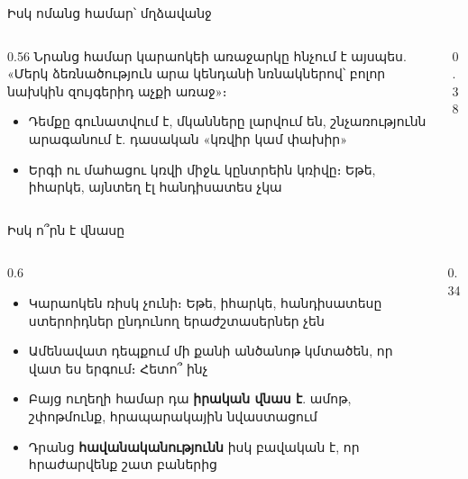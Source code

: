\begin{frame}{Իսկ ոմանց համար՝ մղձավանջ}
  \begin{columns}[c]
    \begin{column}{0.56\textwidth}
      Նրանց համար կարաոկեի առաջարկը հնչում է այսպես. «Մերկ ձեռնածություն արա կենդանի նռնակներով՝ բոլոր նախկին զույգերիդ աչքի առաջ»։\par\medskip
      \begin{itemize}
        \item<2-> Դեմքը գունատվում է, մկանները լարվում են, շնչառությունն արագանում է. դասական «կռվիր կամ փախիր»
        \item<3-> Երգի ու մահացու կռվի միջև կընտրեին կռիվը։ Եթե, իհարկե, այնտեղ էլ հանդիսատես չկա
      \end{itemize}
    \end{column}
    \begin{column}{0.38\textwidth}
      \centering
    \end{column}
  \end{columns}
\end{frame}

\begin{frame}{Իսկ ո՞րն է վնասը}
  \begin{columns}[c]
    \begin{column}{0.6\textwidth}
      \begin{itemize}
        \item Կարաոկեն ռիսկ չունի։ Եթե, իհարկե, հանդիսատեսը ստերոիդներ ընդունող երաժշտասերներ չեն
        \item<2-> Ամենավատ դեպքում մի քանի անծանոթ կմտածեն, որ վատ ես երգում։ Հետո՞ ինչ
        \item<3-> Բայց ուղեղի համար դա \textbf{իրական վնաս է}. ամոթ, շփոթմունք, հրապարակային նվաստացում
        \item<4-> Դրանց \textbf{հավանականությունն} իսկ բավական է, որ հրաժարվենք շատ բաներից
      \end{itemize}
    \end{column}
    \begin{column}{0.34\textwidth}
      \centering
      \par\medskip
    \end{column}
  \end{columns}
\end{frame}

